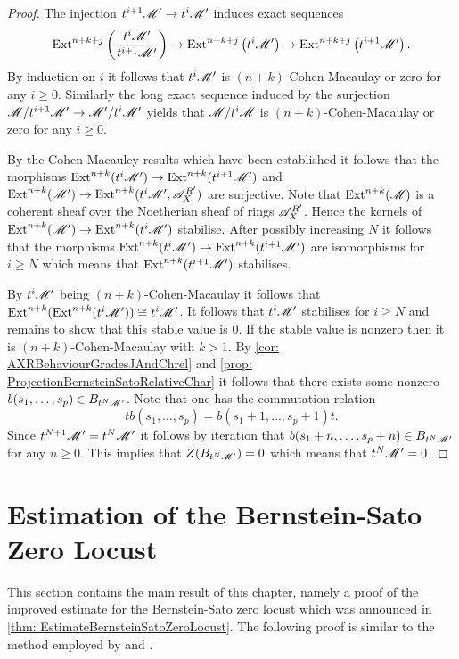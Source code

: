 \begin{proof}
  The injection $t^{i+1} \mathscr{M}'\to t^{i}\mathscr{M}'$ induces exact sequences
  $$\operatorname{Ext}^{n+k+j}\left(\frac{t^i\mathscr{M}'}{ t^{i+1}\mathscr{M}'}\right) \to  \operatorname{Ext}^{n+k+j}\left(t^{i}\mathscr{M}'\right) \to \operatorname{Ext}^{n+k +j}\left(t^{i+1} \mathscr{M}'\right).$$
  By induction on $i$ it follows that $t^i\mathscr{M}'$ is $(n+k)$-Cohen-Macaulay or zero for any $i\geq 0$.
  Similarly the long exact sequence induced by the surjection $\mathscr{M}/t^{i+1}\mathscr{M}' \to \mathscr{M}'/t^{i}\mathscr{M}'$ yields that $\mathscr{M}/t^{i}\mathscr{M}$ is $(n+k)$-Cohen-Macaulay or zero for any $i\geq 0$.


  By the Cohen-Macauley results which have been established it follows that the morphisms $\operatorname{Ext}^{n+k}( t^i\mathscr{M}') \to  \operatorname{Ext}^{n+k}(t^{i+1}\mathscr{M}')$ and $\operatorname{Ext}^{n+k}(\mathscr{M}') \to \operatorname{Ext}^{n+k} (t^i\mathscr{M}',\allowbreak \mathscr{A}_X^{R'})$ are surjective.
  Note that $\operatorname{Ext}^{n+k}(\mathscr{M})$ is a coherent sheaf over the Noetherian sheaf of rings $\mathscr{A}_X^{R'}$.
  Hence the kernels of $\operatorname{Ext}^{n+k}(\mathscr{M}') \to \operatorname{Ext}^{n+k} (t^i\mathscr{M}')$ stabilise.
  After possibly increasing $N$ it follows that the morphisms $\operatorname{Ext}^{n+k}(t^i\mathscr{M}') \to  \operatorname{Ext}^{n+k}(t^{i+1}\mathscr{M}')$ are isomorphisms for $i\geq N$ which means that $\operatorname{Ext}^{n+k}(t^{i+1}\mathscr{M}')$ stabilises.

  By $t^i \mathscr{M}'$ being $(n+k)$-Cohen-Macaulay it follows that $\operatorname{Ext}^{n+k}(\operatorname{Ext}^{n+k}(t^i\mathscr{M}')) \cong t^i\mathscr{M}'$.
  It follows that $t^i \mathscr{M}'$ stabilises for $i\geq N$ and remains to show that this stable value is $0$.
  If the stable value is nonzero then it is $(n+k)$-Cohen-Macaulay with $k>1$.
  By \cref{cor: AXRBehaviourGradesJAndChrel} and \cref{prop: ProjectionBernsteinSatoRelativeChar} it follows that there exists some nonzero $b(s_1,\ldots,s_p) \in B_{t^N\mathscr{M}'}$.
  Note that one has the commutation relation
  $$tb(s_1,\ldots,s_p) = b(s_1+1,\ldots, s_p + 1)t.$$
  Since $t^{N+1}\mathscr{M}' = t^N\mathscr{M}'$ it follows by iteration that $b(s_1+n,\ldots, s_p + n)\in B_{t^N \mathscr{M}'}$ for any $n\geq 0$.
  This implies that $Z(B_{t^N\mathscr{M}'}) = 0$ which means that $t^N\mathscr{M}' = 0$.
\end{proof}
\section{Estimation of the Bernstein-Sato Zero Locust}
This section contains the main result of this chapter, namely a proof of the improved estimate for the Bernstein-Sato zero locust which was announced in \cref{thm: EstimateBernsteinSatoZeroLocust}. The following proof is similar to the method employed by \cite{lichtin1989poles} and \cite{kashiwara1976b}.

